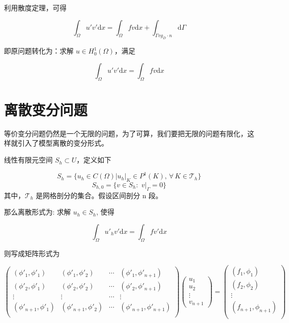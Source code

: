 \documentclass{article}
\begin{document}
利用散度定理，可得

\begin{equation}
	\int_{\Omega} u' v' \mathrm{d}x = \int_{\Omega} fv \mathrm{d}x + \int_{\Gamma v g_D\cdot n}\mathrm{d}\Gamma
\end{equation}

即原问题转化为：求解 $u \in H^1_0(\Omega)$，满足

\begin{equation}
	\int_{\Omega} u' v'\mathrm{d}x = \int_{\Omega} fv \mathrm{d}x
\end{equation}



\section{离散变分问题}

等价变分问题仍然是一个无限的问题，为了可算，我们要把无限的问题有限化，这样就引入了模型离散的变分形式。

线性有限元空间 $S_h \subset U$，定义如下 

	\begin{equation*}
		S_h = \{u_h \in C(\Omega) |u_h|_K \in P^1(K), \, \forall \, K \in \mathcal T_h\}
	\end{equation*}
	\begin{equation*}
		S_{h,0} = \{v \in S_h:\,\, v|_{\Gamma} = 0\}
	\end{equation*}
	其中，$\mathcal T_h$ 是网格剖分的集合。假设区间剖分 n 段。

那么离散形式为: 求解 $u_h \in S_h$, 使得

\begin{equation}
	\int_{\Omega} u'_h v' \mathrm dx = \int_{\Omega} f v' \mathrm dx
\end{equation}

则写成矩阵形式为

\begin{equation}
	\begin{pmatrix}
		(\phi'_1, \phi'_1) & (\phi'_1, \phi'_2) & \cdots & (\phi'_1, \phi'_{n+1}) \\
		(\phi'_2, \phi'_1) & (\phi'_2, \phi'_2) & \cdots & (\phi'_2, \phi'_{n+1}) \\
		\vdots & \vdots & \cdots & \vdots \\
	    (\phi'_{n+1}, \phi'_1) & (\phi'_{n+1}, \phi'_2) & \cdots & (\phi'_{n+1}, \phi'_{n+1}) \\
	\end{pmatrix}
	\begin{pmatrix}
		u_1 \\
		u_2 \\
		\vdots \\
		v_{n+1}
	\end{pmatrix} 
	= \begin{pmatrix}
		(f_1, \phi_1) \\
		(f_2, \phi_2) \\
		\vdots \\
		(f_{n+1}, \phi_{n+1}) \\
	\end{pmatrix}
\end{equation}
\end{document}
